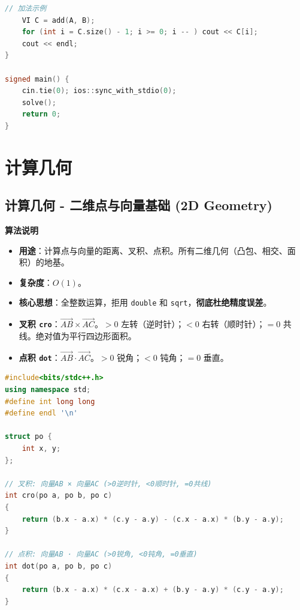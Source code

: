 \documentclass[10pt,landscape,a4paper]{article}
\begin{document}
\begin{multicols*}{3}
\begin{lstlisting}[language=C++]
    // 加法示例
    VI C = add(A, B);
    for (int i = C.size() - 1; i >= 0; i -- ) cout << C[i];
    cout << endl;
}

signed main() {
    cin.tie(0); ios::sync_with_stdio(0);
    solve();
    return 0;
}
\end{lstlisting}
\section*{计算几何}
\subsection*{计算几何 - 二维点与向量基础 (2D Geometry)}
\par\addvspace{0.7ex}\noindent\textbf{算法说明}\par\nobreak
\begin{itemize}
\item \textbf{用途}：计算点与向量的距离、叉积、点积。所有二维几何（凸包、相交、面积）的地基。
\item \textbf{复杂度}：$O(1)$。
\item \textbf{核心思想}：全整数运算，拒用 \texttt{d\allowbreak{}o\allowbreak{}u\allowbreak{}b\allowbreak{}l\allowbreak{}e} 和 \texttt{s\allowbreak{}q\allowbreak{}r\allowbreak{}t}，\textbf{彻底杜绝精度误差}。
\item \textbf{叉积 \texttt{c\allowbreak{}r\allowbreak{}o}}：$\vec{AB} \times \vec{AC}$。$>0$ 左转（逆时针）；$<0$ 右转（顺时针）；$=0$ 共线。绝对值为平行四边形面积。
\item \textbf{点积 \texttt{d\allowbreak{}o\allowbreak{}t}}：$\vec{AB} \cdot \vec{AC}$。$>0$ 锐角；$<0$ 钝角；$=0$ 垂直。
\end{itemize}
\par{}\par
\begin{lstlisting}[language=C++]
#include<bits/stdc++.h>
using namespace std;
#define int long long
#define endl '\n'

struct po {
    int x, y;
};

// 叉积: 向量AB × 向量AC (>0逆时针, <0顺时针, =0共线)
int cro(po a, po b, po c)
{
    return (b.x - a.x) * (c.y - a.y) - (c.x - a.x) * (b.y - a.y);
}

// 点积: 向量AB · 向量AC (>0锐角, <0钝角, =0垂直)
int dot(po a, po b, po c)
{
    return (b.x - a.x) * (c.x - a.x) + (b.y - a.y) * (c.y - a.y);
}


\end{lstlisting}
\end{multicols*}
\end{document}
